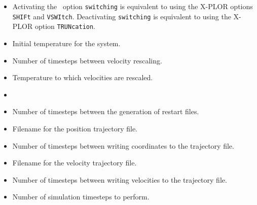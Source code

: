 \begin{itemize}
\item
{}
{Activating the \NAMD\ option {\tt switching} is equivalent 
to using the X-PLOR options {\tt SHIFt} and {\tt VSWItch}.  
Deactivating {\tt switching} is equivalent 
to using the X-PLOR option {\tt TRUNcation}.}

\item
{}
{Initial temperature for the system.}

\item
{}
{Number of timesteps between velocity rescaling.}

\item
{}
{Temperature to which velocities are rescaled.}

\item
{}

\item
{}
{Number of timesteps between the generation of restart files.}

\item
{}
{Filename for the position trajectory file.} 

\item
{}
{Number of timesteps between writing coordinates to the trajectory file.}

\item
{}
{Filename for the velocity trajectory file.}

\item
{}
{Number of timesteps between writing velocities to the trajectory file.} 

\item
{}
{Number of simulation timesteps to perform.}

\end{itemize}

